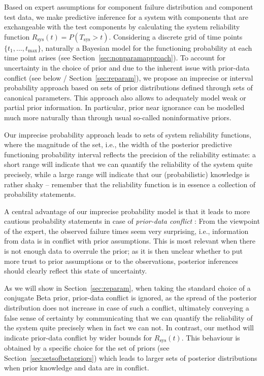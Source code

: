\documentclass[12pt, a4paper]{elsarticle}
\newcommand{\Rsys}{R_\text{sys}}
\def\Tsys{T_\text{sys}}
\def\tmax{t_\text{max}}
\begin{document}
Based on expert assumptions for component failure distribution and component test data,
we make predictive inference for a system with components that are exchangeable
with the test components by calculating the system reliability function $\Rsys(t) = P(\Tsys > t)$.
Considering a discrete grid of time points $\{t_1, \ldots, \tmax\}$,
naturally a Bayesian model for the functioning probability at each time point arises (see Section~\ref{sec:nonparamapproach}).
To account for uncertainty in the choice of prior
and due to the inherent issue with prior-data conflict (see below / Section~\ref{sec:reparam}),
we propose an imprecise or interval probability approach
based on sets of prior distributions defined through sets of canonical parameters.
This approach also allows to adequately model weak or partial prior information.
In particular, prior near ignorance can be modelled much more naturally than through usual so-called noninformative priors. 

Our imprecise probability approach leads to sets of system reliability functions,
where the magnitude of the set, i.e., the width of the posterior predictive functioning probability interval
reflects the precision of the reliability estimate:
a short range will indicate that we can quantify the reliability of the system quite precisely,
while a large range will indicate that our (probabilistic) knowledge is rather shaky --
remember that the reliability function is in essence a collection of probability statements.

A central advantage of our imprecise probability model is
that it leads to more cautious probability statements
in case of \emph{prior-data conflict} \cite[see, e.g.,][]{2006:evans}:
From the viewpoint of the expert, the observed failure times seem very surprising,
i.e., information from data is in conflict with prior assumptions.
This is most relevant when there is not enough data to overrule the prior;
as it is then unclear whether to put more trust to prior assumptions or to the observations,
posterior inferences should clearly reflect this state of uncertainty.

As we will show in Section~\ref{sec:reparam}, when taking the standard choice of a conjugate Beta prior,
prior-data conflict is ignored, as the spread of the posterior distribution does not increase in case of such a conflict,
ultimately conveying a false sense of certainty
by communicating that we can quantify the reliability of the system quite precisely when in fact we can not.
In contrast, our method will indicate prior-data conflict by wider bounds for $\Rsys(t)$.
This behaviour is obtained by a specific choice for the set of priors (see Section~\ref{sec:setsofbetapriors})
which leads to larger sets of posterior distributions when prior knowledge and data are in conflict.
\end{document}
